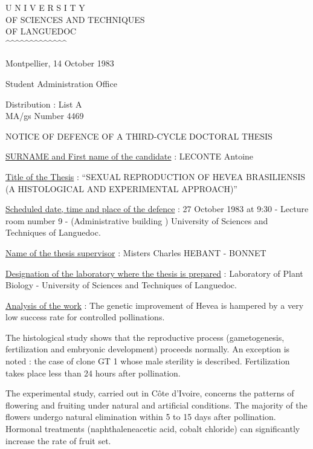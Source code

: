
\begin{center}
U N I V E R S I T Y\\
OF SCIENCES AND TECHNIQUES\\
OF LANGUEDOC\\
\textasciicircum\textasciicircum\textasciicircum\textasciicircum\textasciicircum\textasciicircum\textasciicircum\textasciicircum\textasciicircum\textasciicircum\textasciicircum\textasciicircum\textasciicircum
\end{center}

Montpellier, 14 October 1983

Student Administration Office

Distribution : List A\\
MA/gs \hfill Number 4469

\begin{center}
NOTICE OF DEFENCE OF A THIRD-CYCLE DOCTORAL THESIS

\end{center}

\uline{SURNAME and First name of the candidate} : LECONTE Antoine

\uline{Title of the Thesis} : ``SEXUAL REPRODUCTION OF HEVEA BRASILIENSIS (A HISTOLOGICAL AND EXPERIMENTAL APPROACH)''

\uline{Scheduled date, time and place of the defence} : 27 October 1983 at 9:30 - Lecture room number 9 - (Administrative building ) University of Sciences and Techniques of Languedoc.

\uline{Name of the thesis supervisor} : Misters Charles HEBANT - BONNET

\uline{Designation of the laboratory where the thesis is prepared} : Laboratory of Plant Biology - University of Sciences and Techniques of Languedoc.

\uline{Analysis of the work} : The genetic improvement of Hevea is hampered by a very low success rate for controlled pollinations.

The histological study shows that the reproductive process (gametogenesis, fertilization and embryonic development) proceeds normally. An exception is noted : the case of clone GT 1 whose male sterility is described. Fertilization takes place less than 24 hours after pollination.

The experimental study, carried out in Côte d'Ivoire, concerns the patterns of flowering and fruiting under natural and artificial conditions. The majority of the flowers undergo natural elimination within 5 to 15 days after pollination. Hormonal treatments (naphthaleneacetic acid, cobalt chloride) can significantly increase the rate of fruit set.


